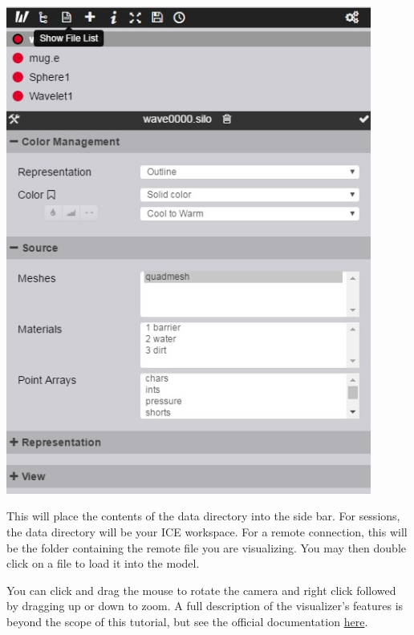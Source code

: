 \begin{center}
\includegraphics[width=12cm]{images/ParaViewVisualizer}
\end{center}

This will place the contents of the data directory into the side bar. For sessions, the data directory will be your ICE workspace. For a remote connection, this will be the folder containing the remote file you are visualizing. You may then double click on a file to load it into the model. 

You can click and drag the mouse to rotate the camera and right click followed
by dragging up or down to zoom. A full description of the visualizer's features
is beyond the scope of this tutorial, but see the official documentation
\href{http://www.paraview.org/ParaView3/Doc/Nightly/www/js-doc/index.html#!/guide/web_visualizer}{here}.